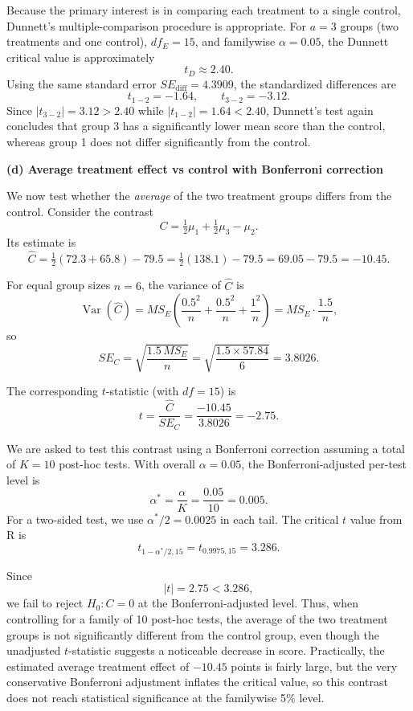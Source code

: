 \documentclass[answers,12pt,addpoints]{exam}
\begin{document}
Because the primary interest is in comparing each treatment to a single control, Dunnett's multiple-comparison procedure is appropriate. For $a=3$ groups (two treatments and one control), $df_E = 15$, and familywise $\alpha = 0.05$, the Dunnett critical value is approximately
\[
t_D \approx 2.40.
\]
Using the same standard error $SE_{\text{diff}} = 4.3909$, the standardized differences are
\[
t_{1-2} = -1.64,\qquad t_{3-2} = -3.12.
\]
Since $|t_{3-2}| = 3.12 > 2.40$ while $|t_{1-2}| = 1.64 < 2.40$, Dunnett's test again concludes that group 3 has a significantly lower mean score than the control, whereas group 1 does not differ significantly from the control.



\medskip
\textbf{(d) Average treatment effect vs control with Bonferroni correction}

We now test whether the \emph{average} of the two treatment groups differs from
the control. Consider the contrast
\[
C = \tfrac{1}{2}\mu_1 + \tfrac{1}{2}\mu_3 - \mu_2.
\]
Its estimate is
\[
\hat{C} = \tfrac{1}{2}(72.3 + 65.8) - 79.5
= \tfrac{1}{2}(138.1) - 79.5 = 69.05 - 79.5 = -10.45.
\]

For equal group sizes $n=6$, the variance of $\hat{C}$ is
\[
\operatorname{Var}(\hat{C}) =
MS_E\left(\frac{0.5^2}{n} + \frac{0.5^2}{n} + \frac{1^2}{n}\right)
= MS_E\cdot\frac{1.5}{n},
\]
so
\[
SE_C = \sqrt{\frac{1.5\,MS_E}{n}}
= \sqrt{\frac{1.5 \times 57.84}{6}} = 3.8026.
\]

The corresponding $t$-statistic (with $df = 15$) is
\[
t = \frac{\hat{C}}{SE_C} = \frac{-10.45}{3.8026} = -2.75.
\]

We are asked to test this contrast using a Bonferroni correction assuming a
total of $K = 10$ post-hoc tests. With overall $\alpha = 0.05$, the
Bonferroni-adjusted per-test level is
\[
\alpha^* = \frac{\alpha}{K} = \frac{0.05}{10} = 0.005.
\]
For a two-sided test, we use $\alpha^*/2 = 0.0025$ in each tail. The critical
$t$ value from R is
\[
t_{1-\alpha^*/2,15} = t_{0.9975,15} = 3.286.
\]

Since
\[
|t| = 2.75 < 3.286,
\]
we fail to reject $H_0 : C = 0$ at the Bonferroni-adjusted level. Thus, when
controlling for a family of 10 post-hoc tests, the average of the two
treatment groups is not significantly different from the control group, even
though the unadjusted $t$-statistic suggests a noticeable decrease in score.
Practically, the estimated average treatment effect of $-10.45$ points is
fairly large, but the very conservative Bonferroni adjustment inflates the
critical value, so this contrast does not reach statistical significance at the
familywise 5\% level.
\end{document}
